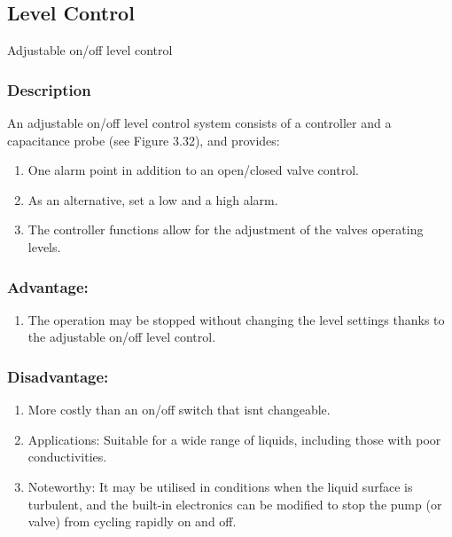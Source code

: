 \subsection{Level Control}

Adjustable on/off level control

\subsubsection{Description}

An adjustable on/off level control system consists of a controller and a
capacitance probe (see Figure 3.32), and provides:

\begin{enumerate}
\item
  One alarm point in addition to an open/closed valve control.
\item
  As an alternative, set a low and a high alarm.
\item
  The controller functions allow for the adjustment of the
  valve\textquotesingle s operating levels.
\end{enumerate}

\subsubsection{Advantage:}

\begin{enumerate}
\item
  The operation may be stopped without changing the level settings
  thanks to the adjustable on/off level control.
\end{enumerate}

\subsubsection{Disadvantage:}

\begin{enumerate}
\item
  More costly than an on/off switch that isn\textquotesingle t
  changeable.
\item
  Applications: Suitable for a wide range of liquids, including those
  with poor conductivities.
\item
Noteworthy:  It may be utilised in conditions when the liquid surface is turbulent,
and the built-in electronics can be modified to stop the pump (or
valve) from cycling rapidly on and off.
\end{enumerate}

